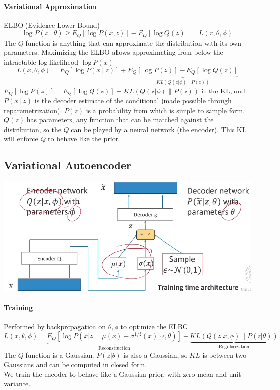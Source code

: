 \documentclass[10pt]{report}
\begin{document}
\paragraph{Variational Approximation} ELBO (Evidence Lower Bound)
$$\log P(x\:|\:\theta)\geq E_Q[\log P(x,z)] - E_Q[\log Q(z)] = L(x,\theta,\phi)$$
The $Q$ function is anything that can approximate the distribution with its own parameters. Maximizing the ELBO allows approximating from below the intractable log-likelihood $\log P(x)$
$$ L(x,\theta,\phi) = E_Q[\log P(x\:|\:z)] + \underset{KL(Q(z|\phi)\|P(z))}{\underbrace{E_Q[\log P(z)] - E_Q[\log Q(z)]}}$$
$E_Q[\log P(z)] - E_Q[\log Q(z)] = KL(Q(z|\phi)\|P(z))$ is the KL, and $P(x\:|\:z)$ is the decoder estimate of the conditional (made possible through reparametrization). $P(z)$ is a probability from which is simple to sample form. $Q(z)$ has parameters, any function that can be matched against the distribution, so the $Q$ can be played by a neural network (the encoder). This KL will enforce $Q$ to behave like the prior.
\subsection{Variational Autoencoder}\begin{center}
	\includegraphics[scale=0.55]{144.png}
\end{center}
\paragraph{Training} Performed by backpropagation on $\theta,\phi$ to optimize the ELBO
$$L(x,\theta,\phi) = \underset{\text{Reconstruction}}{\underbrace{E_Q[\log P(x|z=\mu(x)+\sigma^{1/2}(x)\cdot\epsilon,\theta)]}} - \underset{\text{Regularization}}{\underbrace{KL(Q(z|x,\phi)\|P(z|\theta))}}$$
The $Q$ function is a Gaussian, $P(z|\theta)$ is also a Gaussian, so $KL$ is between two Gaussians and can be computed in closed form.\\
We train the encoder to behave like a Gaussian prior, with zero-mean and unit-variance.
\end{document}
